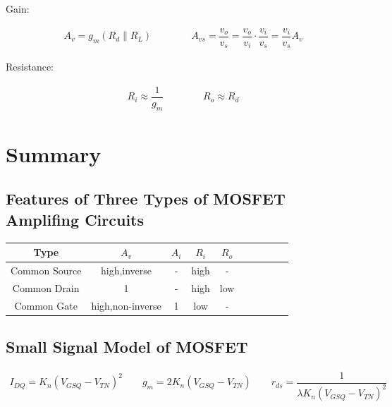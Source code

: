 Gain:

\begin{equation*}
  \begin{aligned}
    A_v = g_m \left( R_d \parallel R_L \right) \quad\quad \quad\quad 
    A_{vs} = \dfrac{v_o}{v_s} = \dfrac{v_o}{v_i} \cdot \dfrac{v_i}{v_s} = \dfrac{v_i}{v_s} A_v
  \end{aligned}
\end{equation*}

Resistance:

\begin{equation*}
  \begin{aligned}
    R_i \approx \dfrac{1}{g_m} \quad\quad \quad\quad 
    R_o \approx R_d
  \end{aligned}
\end{equation*}

\section{Summary}

\subsection{Features of Three Types of MOSFET Amplifing Circuits}

\begin{table}[htbp]
  \centering
  \begin{tabular}{|Sc|Sc|Sc|Sc|Sc|}
    \hline
    Type & $A_v$ & $A_i$ & $R_i$ & $R_o$ \\
    \hline
    Common Source & high,inverse & - & high & - \\
    \hline
    Common Drain & 1 & - & high & low \\
    \hline
    Common Gate & high,non-inverse & 1 & low & - \\
    \hline
  \end{tabular}
\end{table}

\subsection{Small Signal Model of MOSFET}

\begin{equation*}
  \begin{aligned}
    I_{DQ} = K_n \left( V_{GSQ} - V_{TN} \right)^2 \quad\quad
    g_m = 2 K_n \left( V_{GSQ} - V_{TN} \right) \quad\quad
    r_{ds} = \dfrac{1}{\lambda K_n \left( V_{GSQ} - V_{TN} \right)^2} 
  \end{aligned}
\end{equation*}

